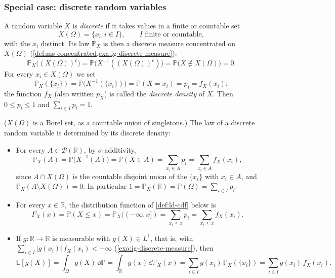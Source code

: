\subsubsection*{Special case: discrete random variables}

\begin{definition}\label{def:ld-discrete}
A random variable $X$ is \emph{discrete} if it takes values in a finite or countable set
\[
  X(\Omega)=\{x_i:i\in I\},\qquad I\text{ finite or countable},
\]
with the $x_i$ distinct. Its law $\mathbb P_X$ is then a discrete measure concentrated on
$X(\Omega)$ (\cref{def:ms-concentrated,exa:ig-discrete-measure}):
\[
  \mathbb P_X\big((X(\Omega))^c\big)=\mathbb P\big(X^{-1}((X(\Omega))^c)\big)=\mathbb P\big(X\notin X(\Omega)\big)=0 .
\]
For every $x_i\in X(\Omega)$ we set
\[
  \mathbb P_X(\{x_i\})=\mathbb P\big(X^{-1}(\{x_i\})\big)=\mathbb P(X=x_i)=p_i=f_X(x_i);
\]
the function $f_X$ (also written $p_X$) is called the \emph{discrete density} of $X$. Then
$0\le p_i\le1$ and $\sum_{i\in I}p_i=1$.
\end{definition}

($X(\Omega)$ is a Borel set, as a countable union of singletons.) The law of a discrete random
variable is determined by its discrete density:
\begin{itemize}
  \item For every $A\in\mathcal B(\mathbb R)$, by $\sigma$-additivity,
    \[
      \mathbb P_X(A)=\mathbb P\big(X^{-1}(A)\big)=\mathbb P(X\in A)=\sum_{x_i\in A}p_i=\sum_{x_i\in A}f_X(x_i),
    \]
    since $A\cap X(\Omega)$ is the countable disjoint union of the $\{x_i\}$ with $x_i\in A$, and
    $\mathbb P_X(A\setminus X(\Omega))=0$. In particular
    $1=\mathbb P_X(\mathbb R)=\mathbb P(\Omega)=\sum_{i\in I}p_i$.
  \item For every $x\in\mathbb R$, the distribution function of \cref{def:ld-cdf} below is
    \[
      F_X(x)=\mathbb P(X\le x)=\mathbb P_X((-\infty,x])=\sum_{x_i\le x}p_i=\sum_{x_i\le x}f_X(x_i).
    \]
  \item If $g:\mathbb R\to\mathbb R$ is measurable with $g(X)\in L^1$, that is, with
    $\sum_{i\in I}|g(x_i)|\,f_X(x_i)<+\infty$ (\cref{exa:ig-discrete-measure}), then
    \begin{equation}\label{eq:ld-discrete-expectation}
      \mathbb E[g(X)]=\int_\Omega g(X)\,\dd\mathbb P=\int_{\mathbb R}g(x)\,\dd\mathbb P_X(x)
      =\sum_{i\in I}g(x_i)\,\mathbb P_X(\{x_i\})=\sum_{i\in I}g(x_i)\,f_X(x_i).
    \end{equation}
\end{itemize}


